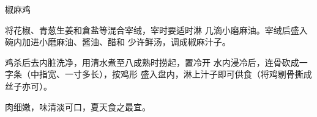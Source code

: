 \begin{recipe}{椒麻鸡}

\ingredients




\cooking

将花椒、青葱生姜和倉盐等混合宰绒，宰时要适时淋 几滴小磨麻油。宰绒后盛入碗内加进小磨麻油、酱油、醋和 少许鲜汤，调成椒麻汁子。

鸡杀后去内脏洗净，用清水煮至八成熟时捞起，置冷开 水内浸冷后，连骨砍成一字条（中指宽、一寸多长），按鸡形 盛入盘内，淋上汁子即可供食（将鸡剔骨撕成丝子亦可）。

\notes

肉细嫩，味清淡可口，夏天食之最宜。

\end{recipe}

